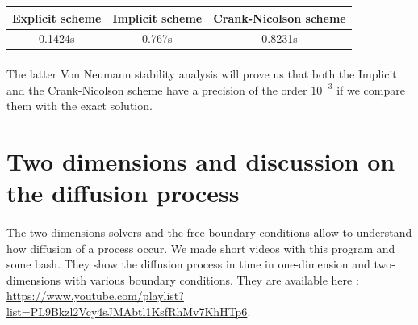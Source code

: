 \documentclass[a4paper, twoside, 11pt]{report}
\theoremstyle{theorem}
\theoremstyle{remark}
\theoremstyle{exemple}
\begin{document}
                \begin{center}
                    \begin{tabular}{|*{3}{c|}}
                        \hline
                            Explicit scheme & Implicit scheme & Crank-Nicolson scheme\\
                        \hline
                            0.1424s & 0.767s & 0.8231s \\
                        \hline
                    \end{tabular}
                \end{center}

                \paragraph{}The latter Von Neumann stability analysis will prove us that both the Implicit and the Crank-Nicolson scheme have a precision of the order ${10}^{-3}$ if we compare them with the exact solution.

        \section{Two dimensions and discussion on the diffusion process}

            \paragraph{}The two-dimensions solvers and the free boundary conditions allow to understand how diffusion of a process occur. We made short videos with this program and some bash. They show the diffusion process in time in one-dimension and two-dimensions with various boundary conditions. They are available here : \url{https://www.youtube.com/playlist?list=PL9Bkzl2Vcy4sJMAbtl1KsfRhMv7KhHTp6}.
\end{document}
